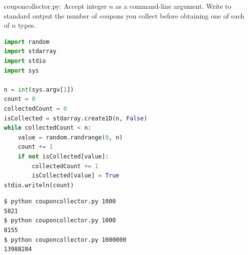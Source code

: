 \documentclass[8pt,a4paper,compress]{beamer}
\begin{document}
\begin{frame}[fragile]
\pause

\begin{framed}
\tiny couponcollector.py: Accept integer $n$ as a command-line argument. Write to standard output the number of coupons you collect before obtaining one of each of $n$ types.
\end{framed}

\begin{lstlisting}[language=Python]
import random
import stdarray
import stdio
import sys

n = int(sys.argv[1])
count = 0
collectedCount = 0
isCollected = stdarray.create1D(n, False)
while collectedCount < n:
    value = random.randrange(0, n)
    count += 1
    if not isCollected[value]:
        collectedCount += 1
        isCollected[value] = True
stdio.writeln(count)
\end{lstlisting}

\pause

\begin{lstlisting}[language={}]
$ python couponcollector.py 1000
5821
$ python couponcollector.py 1000
8155
$ python couponcollector.py 1000000
13988284
\end{lstlisting}
\end{frame}
\end{document}
